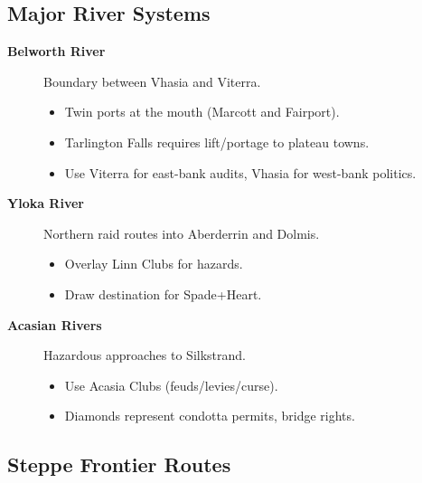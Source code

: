 \subsection{Major River Systems}
\label{subsec:river-systems}

\begin{description}
\item[\textbf{Belworth River}] Boundary between Vhasia and Viterra.
\begin{itemize}
\item Twin ports at the mouth (Marcott and Fairport).
\item Tarlington Falls requires lift/portage to plateau towns.
\item Use Viterra for east-bank audits, Vhasia for west-bank politics.
\end{itemize}

\item[\textbf{Yloka River}] Northern raid routes into Aberderrin and Dolmis.
\begin{itemize}
\item Overlay Linn Clubs for hazards.
\item Draw destination for Spade+Heart.
\end{itemize}

\item[\textbf{Acasian Rivers}] Hazardous approaches to Silkstrand.
\begin{itemize}
\item Use Acasia Clubs (feuds/levies/curse).
\item Diamonds represent condotta permits, bridge rights.
\end{itemize}
\end{description}

\subsection{Steppe Frontier Routes}
\label{subsec:steppe-frontiers}

